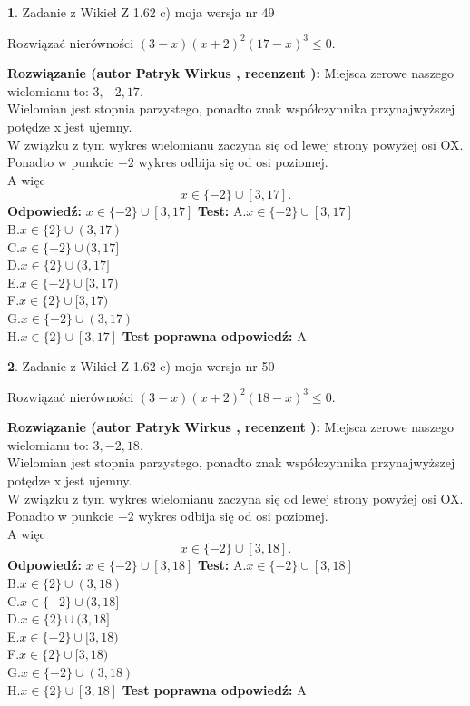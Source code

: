 \documentclass[12pt, a4paper]{article}
\theoremstyle{definition} %
\newtheorem{zad}{}
\newcommand{\zadStart}[1]{\begin{zad}#1\newline}
\newcommand{\zadStop}{\end{zad}}
\newcommand{\rozwStart}[2]{\noindent \textbf{Rozwiązanie (autor #1 , recenzent #2): }\newline}
\newcommand{\rozwStop}{\newline}
\newcommand{\odpStart}{\noindent \textbf{Odpowiedź:}\newline}
\newcommand{\odpStop}{\newline}
\newcommand{\testStart}{\noindent \textbf{Test:}\newline}
\newcommand{\testStop}{\newline}
\newcommand{\kluczStart}{\noindent \textbf{Test poprawna odpowiedź:}\newline}
\newcommand{\kluczStop}{\newline}
\begin{document}
\zadStart{Zadanie z Wikieł Z 1.62 c) moja wersja nr 49}

Rozwiązać nierówności $(3-x)(x+2)^{2}(17-x)^{3}\le0$.
\zadStop
\rozwStart{Patryk Wirkus}{}
Miejsca zerowe naszego wielomianu to: $3, -2, 17$.\\
Wielomian jest stopnia parzystego, ponadto znak współczynnika przy\linebreak najwyższej potędze x jest ujemny.\\ W związku z tym wykres wielomianu zaczyna się od lewej strony powyżej osi OX.\\
Ponadto w punkcie $-2$ wykres odbija się od osi poziomej.\\
A więc $$x \in \{-2\} \cup [3,17].$$
\rozwStop
\odpStart
$x \in \{-2\} \cup [3,17]$
\odpStop
\testStart
A.$x \in \{-2\} \cup [3,17]$\\
B.$x \in \{2\} \cup (3,17)$\\
C.$x \in \{-2\} \cup (3,17]$\\
D.$x \in \{2\} \cup (3,17]$\\
E.$x \in \{-2\} \cup [3,17)$\\
F.$x \in \{2\} \cup [3,17)$\\
G.$x \in \{-2\} \cup (3,17)$\\
H.$x \in \{2\} \cup [3,17]$
\testStop
\kluczStart
A
\kluczStop



\zadStart{Zadanie z Wikieł Z 1.62 c) moja wersja nr 50}

Rozwiązać nierówności $(3-x)(x+2)^{2}(18-x)^{3}\le0$.
\zadStop
\rozwStart{Patryk Wirkus}{}
Miejsca zerowe naszego wielomianu to: $3, -2, 18$.\\
Wielomian jest stopnia parzystego, ponadto znak współczynnika przy\linebreak najwyższej potędze x jest ujemny.\\ W związku z tym wykres wielomianu zaczyna się od lewej strony powyżej osi OX.\\
Ponadto w punkcie $-2$ wykres odbija się od osi poziomej.\\
A więc $$x \in \{-2\} \cup [3,18].$$
\rozwStop
\odpStart
$x \in \{-2\} \cup [3,18]$
\odpStop
\testStart
A.$x \in \{-2\} \cup [3,18]$\\
B.$x \in \{2\} \cup (3,18)$\\
C.$x \in \{-2\} \cup (3,18]$\\
D.$x \in \{2\} \cup (3,18]$\\
E.$x \in \{-2\} \cup [3,18)$\\
F.$x \in \{2\} \cup [3,18)$\\
G.$x \in \{-2\} \cup (3,18)$\\
H.$x \in \{2\} \cup [3,18]$
\testStop
\kluczStart
A
\kluczStop
\end{document}
